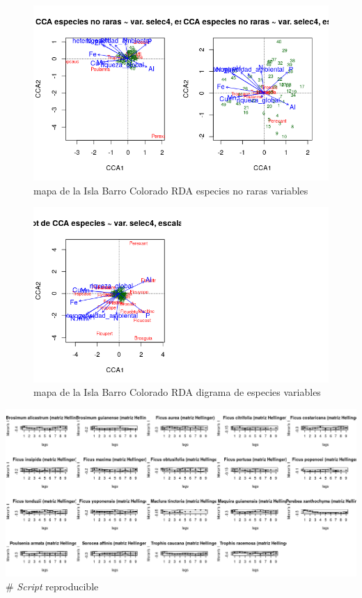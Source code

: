 \documentclass[11pt,]{article}
\begin{document}
\begin{figure}
\centering
\includegraphics[width=1.00000\textwidth]{rda_escalamiento_escala_5.png}
\caption{mapa de la Isla Barro Colorado RDA especies no raras
variables\label{fig:bci_map}}
\end{figure}

\begin{figure}
\centering
\includegraphics[width=1.00000\textwidth]{rda_especies_escala_4.png}
\caption{mapa de la Isla Barro Colorado RDA digrama de especies
variables\label{fig:bci_map}}
\end{figure}

\includegraphics[width=1.00000\textwidth]{multiples_especies.png} \#
\emph{Script} reproducible
\end{document}
